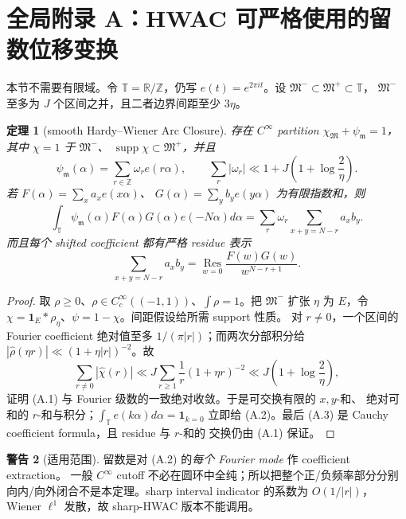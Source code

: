 \documentclass[11pt,a4paper]{ctexart}
\newtheorem{theorem}{定理}[section]
\theoremstyle{definition}
\newtheorem{warning}[theorem]{警告}
\newcommand{\T}{\mathbb T}
\newcommand{\1}{\mathbf 1}
\newcommand{\supp}{\operatorname{supp}}
\newcommand{\Res}{\operatorname*{Res}}
\begin{document}
\section*{全局附录 A：HWAC 可严格使用的留数位移变换}

本节不需要有限域。令 $\T=\mathbb R/\mathbb Z$，仍写
$e(t)=e^{2\pi it}$。设 $\mathfrak M^-\subset\mathfrak M^+\subset\T$，
$\mathfrak M^-$ 至多为 $J$ 个区间之并，且二者边界间距至少 $3\eta$。

\begin{theorem}[smooth Hardy--Wiener Arc Closure]
存在 $C^\infty$ partition
\(
\chi_{\mathfrak M}+\psi_{\mathfrak m}=1
\)，其中 $\chi=1$ 于 $\mathfrak M^-$、
$\supp\chi\subset\mathfrak M^+$，并且
\[
\psi_{\mathfrak m}(\alpha)=\sum_{r\in\mathbb Z}\omega_re(r\alpha),
\qquad
\sum_r|\omega_r|\ll1+J\left(1+\log\frac2\eta\right).   \tag{A.1}
\]
若 $F(\alpha)=\sum_xa_xe(x\alpha)$、
$G(\alpha)=\sum_yb_ye(y\alpha)$ 为有限指数和，则
\[
\boxed{
\int_\T\psi_{\mathfrak m}(\alpha)F(\alpha)G(\alpha)e(-N\alpha)d\alpha
=\sum_r\omega_r\sum_{x+y=N-r}a_xb_y.}                 \tag{A.2}
\]
而且每个 shifted coefficient 都有严格 residue 表示
\[
\sum_{x+y=N-r}a_xb_y
=\Res_{w=0}\frac{F(w)G(w)}{w^{N-r+1}}.                 \tag{A.3}
\]
\end{theorem}

\begin{proof}
取 $\rho\ge0$、$\rho\in C_c^\infty((-1,1))$、$\int\rho=1$。把
$\mathfrak M^-$ 扩张 $\eta$ 为 $E$，令
$\chi=\1_E*\rho_\eta$、$\psi=1-\chi$。间距假设给所需 support 性质。
对 $r\ne0$，一个区间的 Fourier coefficient 绝对值至多
$1/(\pi|r|)$；而两次分部积分给
$|\widehat\rho(\eta r)|\ll(1+\eta|r|)^{-2}$。故
\[
\sum_{r\ne0}|\widehat\chi(r)|
\ll J\sum_{r\ge1}\frac1r(1+\eta r)^{-2}
\ll J\left(1+\log\frac2\eta\right),
\]
证明 (A.1) 与 Fourier 级数的一致绝对收敛。于是可交换有限的 $x,y$-和、
绝对可和的 $r$-和与积分；$\int_\T e(k\alpha)d\alpha=\1_{k=0}$ 立即给
(A.2)。最后 (A.3) 是 Cauchy coefficient formula，且 residue 与 $r$-和的
交换仍由 (A.1) 保证。
\end{proof}

\begin{warning}[适用范围]
留数是对 (A.2) 的\emph{每个 Fourier mode} 作 coefficient extraction。
一般 $C^\infty$ cutoff 不必在圆环中全纯；所以把整个正/负频率部分分别
向内/向外闭合不是本定理。sharp interval indicator 的系数为 $O(1/|r|)$，
Wiener $\ell^1$ 发散，故 sharp-HWAC 版本不能调用。
\end{warning}
\end{document}
